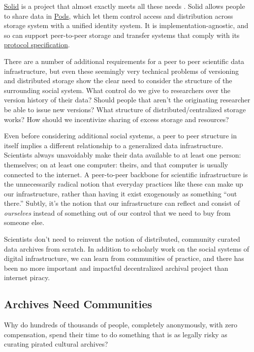 \documentclass[10pt]{tufte-book}
\begin{document}
\href{https://solidproject.org/}{Solid} is a project that almost exactly
meets all these needs \citep{capadisliSolidProtocol2020, sambraSolidPlatformDecentralized2016, SolidP2PFoundation} . Solid
allows people to share data in
\href{https://solidproject.org/about}{Pods}, which let them control
access and distribution across storage system with a unified identity
system. It is implementation-agnostic, and so can support peer-to-peer
storage and transfer systems that comply with its
\href{https://solidproject.org/TR/protocol}{protocol specification}.

There are a number of additional requirements for a peer to peer
scientific data infrastructure, but even these seemingly very technical
problems of versioning and distributed storage show the clear need to
consider the structure of the surrounding social system. What control do
we give to researchers over the version history of their data? Should
people that aren't the originating researcher be able to issue new
versions? What structure of distributed/centralized storage works? How
should we incentivize sharing of excess storage and resources?

Even before considering additional social systems, a peer to peer
structure in itself implies a different relationship to a generalized
data infrastructure. Scientists always unavoidably make their data
available to at least one person: themselves; on at least one computer:
theirs, and that computer is usually connected to the internet. A
peer-to-peer backbone for scientific infrastructure is the unnecessarily
radical notion that everyday practices like these can make up our
infrastructure, rather than having it exist exogenously as something
``out there.'' Subtly, it's the notion that our infrastructure can
reflect and consist of \emph{ourselves} instead of something out of our
control that we need to buy from someone else.

Scientists don't need to reinvent the notion of distributed, community
curated data archives from scratch. In addition to scholarly work on the
social systems of digital infrastructure, we can learn from communities
of practice, and there has been no more important and impactful
decentralized archival project than internet piracy.


\subsection{Archives Need
Communities}

Why do hundreds of thousands of people, completely anonymously, with
zero compensation, spend their time to do something that is as legally
risky as curating pirated cultural archives?
\end{document}
